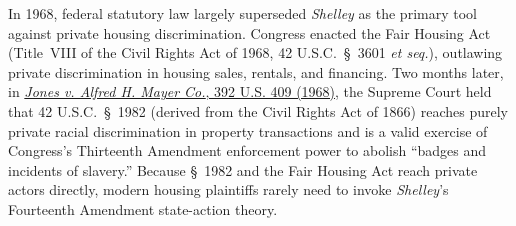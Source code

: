 \documentclass[12pt]{article}
\begin{document}
In 1968, federal statutory law largely superseded \textit{Shelley} as the primary tool against private housing discrimination. Congress enacted the Fair Housing Act (Title~VIII of the Civil Rights Act of 1968, 42 U.S.C.~\S~3601 \textit{et seq.}), outlawing private discrimination in housing sales, rentals, and financing. Two months later, in \href{https://supreme.justia.com/cases/federal/us/392/409/}{\textit{Jones v. Alfred H. Mayer Co.}, 392 U.S. 409 (1968)}, the Supreme Court held that 42 U.S.C.~\S~1982 (derived from the Civil Rights Act of 1866) reaches purely private racial discrimination in property transactions and is a valid exercise of Congress's Thirteenth Amendment enforcement power to abolish ``badges and incidents of slavery.'' Because \S~1982 and the Fair Housing Act reach private actors directly, modern housing plaintiffs rarely need to invoke \textit{Shelley}'s Fourteenth Amendment state-action theory.
\end{document}
